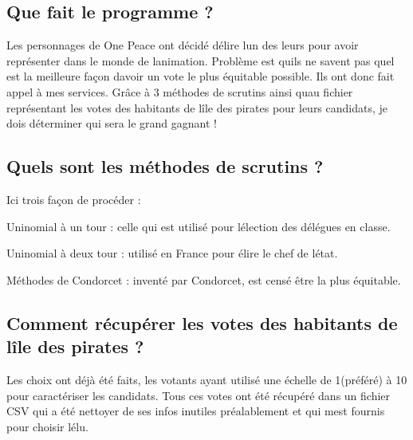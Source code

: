 \subsection*{Que fait le programme ?}

Les personnages de One Peace ont décidé d\textquotesingle{}élire l\textquotesingle{}un des leurs pour avoir représenter dans le monde de l\textquotesingle{}animation. Problème est qu\textquotesingle{}ils ne savent pas quel est la meilleure façon d\textquotesingle{}avoir un vote le plus équitable possible. Ils ont donc fait appel à mes services. Grâce à 3 méthodes de scrutins ainsi qu\textquotesingle{}au fichier représentant les votes des habitants de l\textquotesingle{}île des pirates pour leurs candidats, je dois déterminer qui sera le grand gagnant !

\subsection*{Quels sont les méthodes de scrutins ?}

Ici trois façon de procéder \+:
\begin{DoxyItemize}
\item Uninomial à un tour \+: celle qui est utilisé pour l\textquotesingle{}élection des délégues en classe.
\item Uninomial à deux tour \+: utilisé en France pour élire le chef de l\textquotesingle{}état.
\item Méthodes de Condorcet \+: inventé par Condorcet, est censé être la plus équitable.
\end{DoxyItemize}

\subsection*{Comment récupérer les votes des habitants de l\textquotesingle{}île des pirates ?}

Les choix ont déjà été faits, les votants ayant utilisé une échelle de 1(préféré) à 10 pour caractériser les candidats. Tous ces votes ont été récupéré dans un fichier C\+SV qui a été nettoyer de ses infos inutiles préalablement et qui m\textquotesingle{}est fournis pour choisir l\textquotesingle{}élu. 